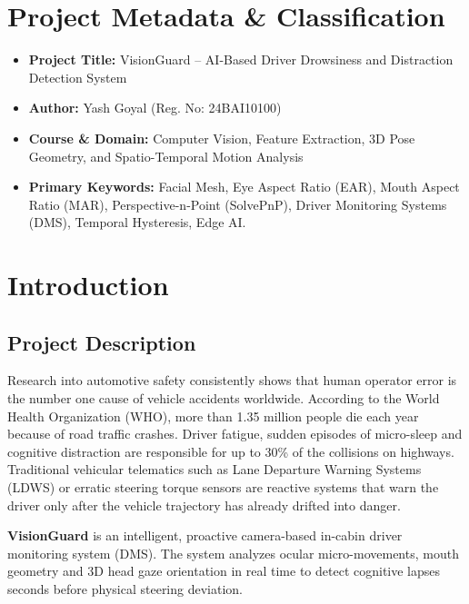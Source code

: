 \documentclass[11pt,a4paper]{article}
\begin{document}
\newpage
\tableofcontents
\newpage

\section{Project Metadata \& Classification}
\begin{itemize}
    \item \textbf{Project Title:} VisionGuard -- AI-Based Driver Drowsiness and Distraction Detection System
    \item \textbf{Author:} Yash Goyal (Reg. No: 24BAI10100)
    \item \textbf{Course \& Domain:} Computer Vision, Feature Extraction, 3D Pose Geometry, and Spatio-Temporal Motion Analysis
    \item \textbf{Primary Keywords:} Facial Mesh, Eye Aspect Ratio (EAR), Mouth Aspect Ratio (MAR), Perspective-n-Point (SolvePnP), Driver Monitoring Systems (DMS), Temporal Hysteresis, Edge AI.
\end{itemize}

\section{Introduction}
\subsection{Project Description}
Research into automotive safety consistently shows that human operator error is the number one cause of vehicle accidents worldwide. According to the World Health Organization (WHO), more than 1.35 million people die each year because of road traffic crashes. Driver fatigue, sudden episodes of micro-sleep and cognitive distraction are responsible for up to 30\% of the collisions on highways. Traditional vehicular telematics such as Lane Departure Warning Systems (LDWS) or erratic steering torque sensors are reactive systems that warn the driver only after the vehicle trajectory has already drifted into danger.

\textbf{VisionGuard} is an intelligent, proactive camera-based in-cabin driver monitoring system (DMS). The system analyzes ocular micro-movements, mouth geometry and 3D head gaze orientation in real time to detect cognitive lapses seconds before physical steering deviation.
\end{document}
